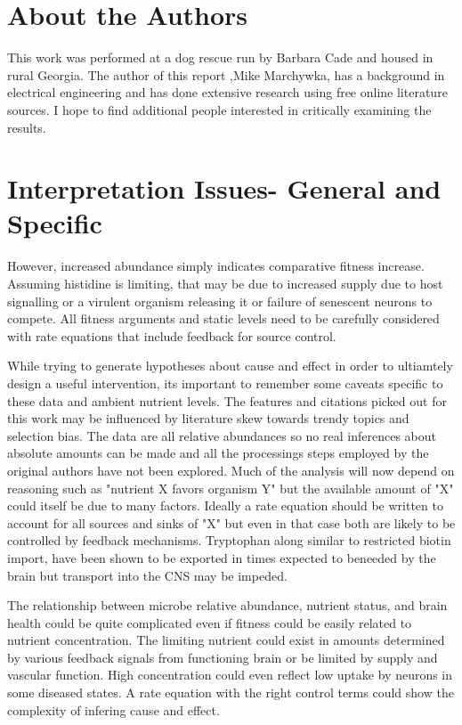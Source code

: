 \documentclass[aps,secnumarabic,balancelastpage,amsmath,amssymb,nofootinbib]{revtex4}
\begin{document}
\section{About the Authors}
This work was performed at a dog rescue run by Barbara Cade and
housed in rural Georgia.  The author of this report 
,Mike Marchywka,
has a background in electrical engineering and 
has done extensive research using free online literature sources.  
I hope to find additional people interested in critically 
examining the results.

\section{Interpretation Issues- General and Specific }
\label{appendix:interp}


However, increased abundance simply indicates comparative fitness
increase. Assuming histidine is limiting, that may be due to
increased supply due to host signalling or a virulent
organism releasing it or failure of senescent neurons to 
compete. All fitness arguments and static levels need to
be carefully considered with rate equations that include
feedback for source control.  

While trying to generate hypotheses about cause and effect
in order to ultiamtely design a useful intervention, its
important to remember some caveats specific to these data
and ambient nutrient levels. 
The features and citations picked out for this work may be
influenced by literature skew towards trendy topics and
selection bias. 
The data are all relative
abundances so no real inferences about absolute
amounts can be made and all the processings
steps employed by the original authors have not been
explored. Much of the analysis will now depend
on reasoning such as "nutrient X favors organism Y"
but the available amount of "X" could itself be
due to many factors. Ideally a rate equation
should be written to account for all sources and sinks
of "X" but even in that case both are likely to be
controlled by feedback mechanisms. Tryptophan along
similar to restricted  biotin import,  have been shown to be exported in
times expected to beneeded by the brain but
transport into the CNS may be impeded. 



The relationship between microbe relative abundance,
nutrient status, and brain health could be quite complicated
even if fitness could be easily related to nutrient
concentration. The limiting nutrient could exist
in amounts determined by various feedback signals
from functioning brain or be limited by supply and
vascular function. High concentration could even reflect
low uptake by neurons in some diseased states. A rate
equation with the right control terms could show the complexity
of infering cause and effect. 
\end{document}
